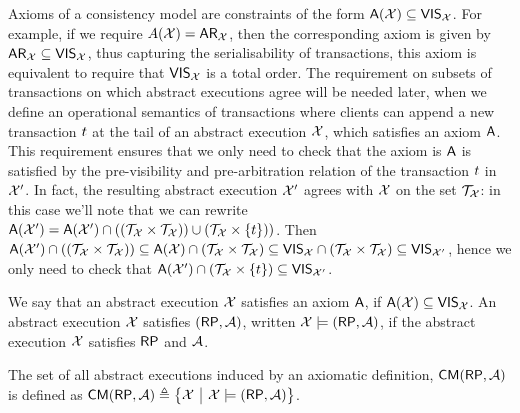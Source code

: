 Axioms of a consistency model are constraints of the form $\mathsf{A}(\mathcal{X}) \subseteq \mathsf{VIS}_{\mathcal{X}}$. 
For example, if we require $A(\mathcal{X}) = \mathsf{AR}_{\mathcal{X}}$, 
then the corresponding axiom is given by $\mathsf{AR}_{\mathcal{X}} \subseteq \mathsf{VIS}_{\mathcal{X}}$,
thus capturing the serialisability of transactions,
\ie this axiom is equivalent to require that $\mathsf{VIS}_{\mathcal{X}}$ is a total order.
The requirement on subsets of transactions on which 
abstract executions agree will be needed later, 
when we define an operational semantics of transactions where 
clients can append a new transaction $t$ at the tail of an abstract execution $\mathcal{X}$,
which satisfies an axiom $\mathsf{A}$. This requirement ensures that 
we only need to check that the axiom is $\mathsf{A}$ is satisfied by the pre-visibility 
and pre-arbitration relation of the transaction $t$ in $\mathcal{X}'$. 
In fact, the resulting abstract execution $\mathcal{X}'$ agrees with $\mathcal{X}$ on the set $\mathcal{T}_{\mathcal{X}}$: 
in this case we'll note that we can rewrite 
$\mathsf{A}(\mathcal{X}') = \mathsf{A}(\mathcal{X}') \cap ((\mathcal{T}_{\mathcal{X}} \times \mathcal{T}_{\mathcal{X}}) ) \cup (\mathcal{T}_{\mathcal{X}} \times \{t\}))$.
Then
$\mathsf{A}(\mathcal{X}') \cap ((\mathcal{T}_{\mathcal{X}} \times \mathcal{T}_{\mathcal{X}})) \subseteq \mathsf{A}(\mathcal{X}) \cap (\mathcal{T}_{\mathcal{X}} \times \mathcal{T}_{\mathcal{X}}) \subseteq \mathsf{VIS}_{\mathcal{X}} \cap (\mathcal{T}_{\mathcal{X}} \times \mathcal{T}_{\mathcal{X}}) \subseteq \mathsf{VIS}_{\mathcal{X}'}$, 
hence we only need to check that $\mathsf{A}(\mathcal{X}') \cap (\mathcal{T}_{\mathcal{X}} \times \{t\}) \subseteq \mathsf{VIS}_{\mathcal{X}'}$.

We say that an abstract execution $\mathcal{X}$ satisfies an axiom $\mathsf{A}$, 
if $\mathsf{A}(\mathcal{X}) \subseteq \mathsf{VIS}_{\mathcal{X}}$. 
An abstract execution $\mathcal{X}$ satisfies $(\RP,\Ax)$, written $\aexec \models (\RP,\Ax)$,  
if the abstract execution \( \mathcal{X} \) satisfies \( \RP \) and \( \mathcal{A} \).

\begin{definition}
\label{def:axiom-to-aexec}
The set of all abstract executions induced by an axiomatic definition, \( \CMa(\RP,\Ax)\) is defined as \( \CMa(\RP,\Ax) \defeq \Set{\aexec}[\aexec \models (\RP,\Ax)]\).
\end{definition}

